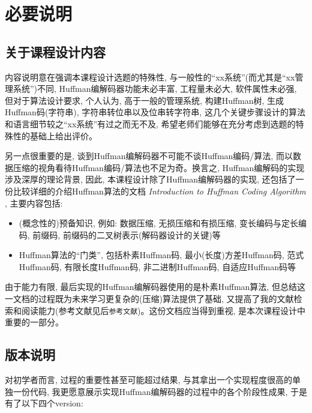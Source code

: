 \documentclass[a4paper]{ctexart}
\begin{document}
 

\tableofcontents

\newpage


\section{必要说明}\label{header-n3}

\subsection{关于课程设计内容}\label{header-n4}

内容说明意在强调本课程设计选题的特殊性, 与一般性的“xx系统”(而尤其是“xx管理系统”)不同,  Huffman编解码器功能未必丰富, 工程量未必大, 软件属性未必强, 但对于算法设计要求, 个人认为, 高于一般的管理系统, 构建Huffman树, 生成Huffman码(字符串), 字符串转位串以及位串转字符串, 这几个关键步骤设计的算法和语言细节较之“xx系统”有过之而无不及, 希望老师们能够在充分考虑到选题的特殊性的基础上给出评价。

另一点很重要的是, 谈到Huffman编解码器不可能不谈Huffman编码/算法, 而以数据压缩的视角看待Huffman编码/算法也不足为奇。换言之, Huffman编解码的实现涉及深厚的理论背景, 因此, 本课程设计除了Huffman编解码器的实现, 还包括了一份比较详细的介绍Huffman算法的文档 \emph{Introduction to Huffman Coding Algorithm} , 主要内容包括:

\begin{itemize}
\item
(概念性的)预备知识, 例如: 数据压缩, 无损压缩和有损压缩, 变长编码与定长编码, 前缀码, 前缀码的二叉树表示(解码器设计的关键)等
\item
Huffman算法的“门类”, 包括朴素Huffman码, 最小(长度)方差Huffman码, 范式Huffman码, 有限长度Huffman码, 非二进制Huffman码, 自适应Huffman码等
\end{itemize}

由于能力有限, 最后实现的Huffman编解码器使用的是朴素Huffman算法, 但总结这一文档的过程既为未来学习更复杂的(压缩)算法提供了基础, 又提高了我的文献检索和阅读能力(参考文献见后\texttt{参考文献})。这份文档应当得到重视, 是本次课程设计中重要的一部分。

\subsection{版本说明}\label{header-n13}

对初学者而言, 过程的重要性甚至可能超过结果, 与其拿出一个实现程度很高的单独一份代码, 我更愿意展示实现Huffman编解码器的过程中的各个阶段性成果, 于是有了以下四个version:
\end{document}
